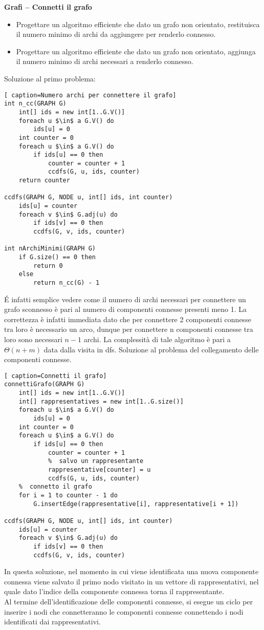 \documentclass[../cheatSheetAlgoritmi.tex]{subfiles}
\begin{document}
\bigskip
\textbf{Grafi – Connetti il grafo}

\begin{itemize}
	\item Progettare un algoritmo efficiente che dato un grafo non orientato, restituisca il numero minimo di archi da aggiungere per renderlo connesso.
	\item Progettare un algoritmo efficiente che dato un grafo non orientato, aggiunga il numero minimo di archi necessari a renderlo connesso.
\end{itemize}

Soluzione al primo problema:
\newpage
\begin{lstlisting}[ caption=Numero archi per connettere il grafo]
int n_cc(GRAPH G)
	int[] ids = new int[1..G.V()]
  	foreach u $\in$ a G.V() do
    	ids[u] = 0
  	int counter = 0
  	foreach u $\in$ a G.V() do
    	if ids[u] == 0 then
      		counter = counter + 1
      		ccdfs(G, u, ids, counter)
  	return counter

ccdfs(GRAPH G, NODE u, int[] ids, int counter)
	ids[u] = counter
  	foreach v $\in$ G.adj(u) do
    	if ids[v] == 0 then
      	ccdfs(G, v, ids, counter)

int nArchiMinimi(GRAPH G)
	if G.size() == 0 then
    	return 0
  	else
    	return n_cc(G) - 1
\end{lstlisting}
É infatti semplice vedere come il numero di archi necessari per connettere un grafo sconnesso è pari al numero di componenti connesse presenti meno 1. La correttezza è infatti immediata dato che per connettere 2 componenti connesse tra loro è necessario un arco, dunque per connettere n componenti connesse tra loro sono necessari $n-1$ archi. La complessità di tale algoritmo è pari a $\Theta(n + m)$ data dalla visita in dfs. Soluzione al problema del collegamento delle componenti connesse.
\begin{lstlisting}[ caption=Connetti il grafo]
connettiGrafo(GRAPH G)
	int[] ids = new int[1..G.V()]
  	int[] rappresentatives = new int[1..G.size()]
  	foreach u $\in$ a G.V() do
    	ids[u] = 0
  	int counter = 0
  	foreach u $\in$ a G.V() do
    	if ids[u] == 0 then
      		counter = counter + 1
      		%  salvo un rappresentante
      		rappresentative[counter] = u
      		ccdfs(G, u, ids, counter)
  	%  connetto il grafo
  	for i = 1 to counter - 1 do
  		G.insertEdge(rappresentative[i], rappresentative[i + 1])
  
ccdfs(GRAPH G, NODE u, int[] ids, int counter)
	ids[u] = counter
  	foreach v $\in$ G.adj(u) do
    	if ids[v] == 0 then
      	ccdfs(G, v, ids, counter)
\end{lstlisting}
In questa soluzione, nel momento in cui viene identificata una nuova componente connessa viene salvato il primo nodo visitato in un vettore di rappresentativi, nel quale dato l'indice della componente connessa torna il rappresentante. \\
Al termine dell'identificazione delle componenti connesse, si esegue un ciclo per inserire i nodi che connetteranno le componenti connesse connettendo i nodi identificati dai rappresentativi.
\end{document}
